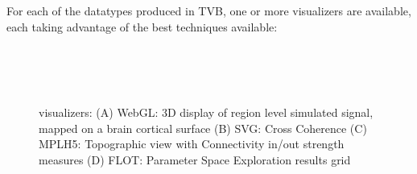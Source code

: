 			For each of the datatypes produced in TVB, one or more
			visualizers are available, each taking advantage of the best
            techniques available:

			 \begin{figure}[!htbp]
					\\
					\\
					\\
					\caption{\TVB visualizers: 
					(A) WebGL: 3D display of region level simulated signal, mapped on a brain cortical surface
					(B) SVG: Cross Coherence
					(C) MPLH5:  Topographic view with Connectivity in/out strength measures
					(D) FLOT: Parameter Space Exploration results grid}
				\label{fig:visualizers}
			\end{figure}
	
